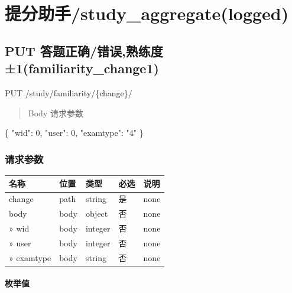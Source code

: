 \documentclass[
]{article}
\newenvironment{Shaded}{}{}
\newcommand{\DataTypeTok}[1]{\textcolor[rgb]{0.56,0.13,0.00}{#1}}
\newcommand{\DecValTok}[1]{\textcolor[rgb]{0.25,0.63,0.44}{#1}}
\newcommand{\FunctionTok}[1]{\textcolor[rgb]{0.02,0.16,0.49}{#1}}
\newcommand{\StringTok}[1]{\textcolor[rgb]{0.25,0.44,0.63}{#1}}
\begin{document}
\hypertarget{ux63d0ux5206ux52a9ux624bstudyaggregatelogged}{%
\section{提分助手/study\_aggregate(logged)}\label{ux63d0ux5206ux52a9ux624bstudyaggregatelogged}}

\hypertarget{put-ux7b54ux9898ux6b63ux786eux9519ux8befux719fux7ec3ux5ea6uxb11familiaritychange1-1}{%
\subsection{PUT
答题正确/错误,熟练度±1(familiarity\_change1)}\label{put-ux7b54ux9898ux6b63ux786eux9519ux8befux719fux7ec3ux5ea6uxb11familiaritychange1-1}}

PUT /study/familiarity/\{change\}/

\begin{quote}
Body 请求参数
\end{quote}

\begin{Shaded}
\begin{Highlighting}[]
\FunctionTok{\{}
  \DataTypeTok{"wid"}\FunctionTok{:} \DecValTok{0}\FunctionTok{,}
  \DataTypeTok{"user"}\FunctionTok{:} \DecValTok{0}\FunctionTok{,}
  \DataTypeTok{"examtype"}\FunctionTok{:} \StringTok{"4"}
\FunctionTok{\}}
\end{Highlighting}
\end{Shaded}

\hypertarget{ux8bf7ux6c42ux53c2ux6570-10}{%
\subsubsection{请求参数}\label{ux8bf7ux6c42ux53c2ux6570-10}}

\begin{longtable}[]{@{}lllll@{}}
\toprule
名称 & 位置 & 类型 & 必选 & 说明 \\
\midrule
\endhead
change & path & string & 是 & none \\
body & body & object & 否 & none \\
» wid & body & integer & 否 & none \\
» user & body & integer & 否 & none \\
» examtype & body & string & 否 & none \\
\bottomrule
\end{longtable}

\hypertarget{ux679aux4e3eux503c-1}{%
\paragraph{枚举值}\label{ux679aux4e3eux503c-1}}
\end{document}
